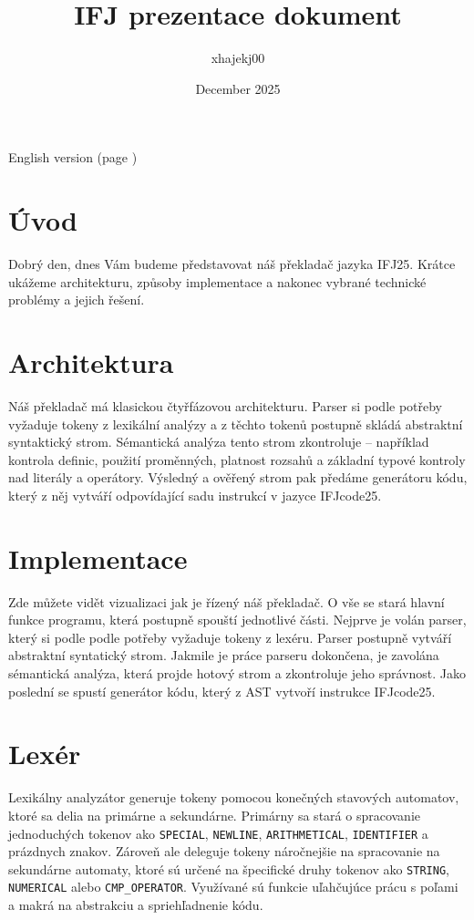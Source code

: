 \documentclass{article}
\title{IFJ prezentace dokument}
\author{xhajekj00}
\date{December 2025}
\begin{document}
English version (page \pageref{AI})
\section{Úvod} %
Dobrý den, dnes Vám budeme představovat náš překladač jazyka IFJ25. Krátce ukážeme architekturu, způsoby implementace a nakonec vybrané technické problémy a jejich řešení.

\section{Architektura}
Náš překladač má klasickou čtyřfázovou architekturu. Parser si podle potřeby vyžaduje tokeny z lexikální analýzy a z těchto tokenů postupně skládá abstraktní syntaktický strom. Sémantická analýza tento strom zkontroluje – například kontrola definic, použití proměnných, platnost rozsahů a základní typové kontroly nad literály a operátory. Výsledný a ověřený strom pak předáme generátoru kódu, který z něj vytváří odpovídající sadu instrukcí v jazyce IFJcode25.

\section{Implementace}
Zde můžete vidět vizualizaci jak je řízený náš překladač. O vše se stará hlavní funkce programu, která postupně spouští jednotlivé části. Nejprve je volán parser, který si podle podle potřeby vyžaduje tokeny z lexéru. Parser postupně vytváří abstraktní syntatický strom. Jakmile je práce parseru dokončena, je zavolána sémantická analýza, která projde hotový strom a zkontroluje jeho správnost. Jako poslední se spustí generátor kódu, který z AST vytvoří instrukce IFJcode25.

\section{Lexér}
Lexikálny analyzátor generuje tokeny pomocou konečných stavových automatov, ktoré sa delia na primárne a sekundárne. Primárny sa stará o spracovanie jednoduchých tokenov ako \texttt{SPECIAL}, \texttt{NEWLINE}, \texttt{ARITHMETICAL}, \texttt{IDENTIFIER} a prázdnych znakov. Zároveň ale deleguje tokeny náročnejšie na spracovanie na sekundárne automaty, ktoré sú určené na špecifické druhy tokenov ako \texttt{STRING}, \texttt{NUMERICAL} alebo \texttt{CMP\_OPERATOR}. 
Využívané sú funkcie uľahčujúce prácu s poľami a makrá na abstrakciu a spriehľadnenie kódu.
\end{document}
